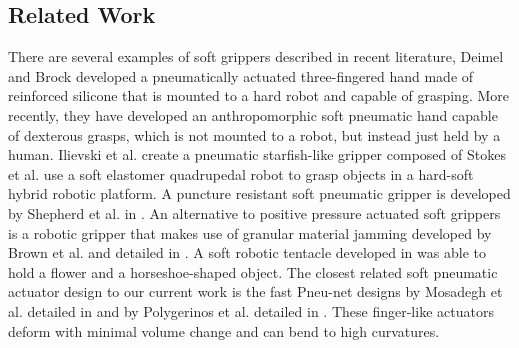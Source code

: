 \subsection{Related Work}
There are several examples of soft grippers described in recent literature,  
Deimel and Brock \cite{deimel2013compliant} developed a pneumatically actuated three-fingered hand made of reinforced silicone that is mounted to a hard robot and capable of grasping.
More recently, they have developed an anthropomorphic soft pneumatic hand capable of dexterous grasps, which is not mounted to a robot, but instead just held by a human\cite{deimel2014novel}. 
Ilievski et al. \cite{ilievski2011soft} create  a pneumatic starfish-like gripper composed of  
Stokes et al. \cite{Stokes2014hybrid} use a soft elastomer quadrupedal robot to grasp objects in a hard-soft hybrid robotic platform. 
A puncture resistant soft pneumatic gripper is developed by Shepherd et al. in \cite{shepherd2013soft}. 
An alternative to positive pressure actuated soft grippers is a robotic gripper that makes use of granular material jamming developed by Brown et al. and detailed in \cite{brown2010universal}.
A soft robotic tentacle developed in \cite{martinez2013robotic} was able to hold a flower and a horseshoe-shaped object.
The closest related soft pneumatic actuator design to our current work is the fast Pneu-net designs by Mosadegh et al. detailed in \cite{mosadegh2014pneumatic} and by Polygerinos et al. detailed in \cite{polygerinos2013towards}.
These finger-like actuators deform with minimal volume change and can bend to high curvatures.


